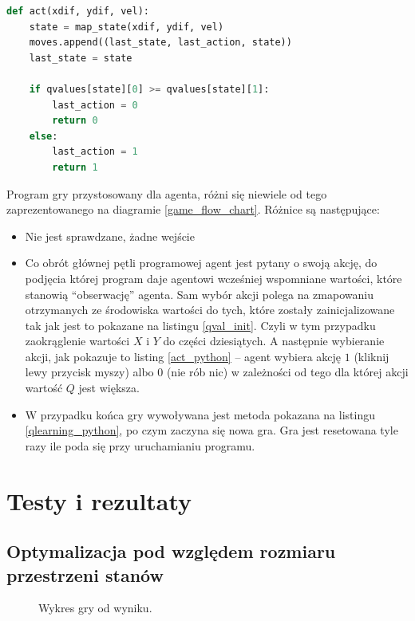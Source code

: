 \documentclass[a4paper, 12pt,oneside]{book}
\begin{document}
\begin{lstlisting}[language=Python, label={act_python},
caption={Metoda wybierająca akcję agenta}, captionpos=t]
def act(xdif, ydif, vel):
    state = map_state(xdif, ydif, vel)
    moves.append((last_state, last_action, state))
    last_state = state

    if qvalues[state][0] >= qvalues[state][1]:
        last_action = 0
        return 0
    else:
        last_action = 1
        return 1
\end{lstlisting}
Program gry przystosowany dla agenta, różni się niewiele od tego
zaprezentowanego na diagramie \ref{game_flow_chart}. Różnice są następujące:
\begin{itemize}
\setlength\itemsep{-0.4em}
\item Nie jest sprawdzane, żadne wejście
\item Co obrót głównej pętli programowej agent jest pytany o swoją akcję, do
	podjęcia której program daje agentowi wcześniej wspomniane wartości,
	które stanowią ``obserwację'' agenta. Sam wybór akcji polega na
	zmapowaniu otrzymanych ze środowiska wartości do tych, które zostały
	zainicjalizowane tak jak jest to pokazane na listingu \ref{qval_init}.
	Czyli w tym przypadku zaokrąglenie wartości $X$ i $Y$ do części
	dziesiątych. A następnie wybieranie akcji, jak pokazuje to
	listing \ref{act_python} -- agent wybiera akcję $1$ (kliknij lewy
	przycisk myszy) albo $0$ (nie rób nic) w zależności od tego dla której
	akcji wartość $Q$ jest większa.
\item W przypadku końca gry wywoływana jest metoda pokazana na listingu
	\ref{qlearning_python},  po czym zaczyna się nowa gra. Gra jest
	resetowana tyle razy ile poda się przy uruchamianiu programu.
\end{itemize}

\chapter{Testy i rezultaty}
\label{chapter:testy}
\section{Optymalizacja pod względem rozmiaru przestrzeni stanów}
\begin{figure}[!htb]
	\begin{center}
		
	\end{center}
	\caption{Wykres gry od wyniku.}
	\label{plot_first_approach}
\end{figure}
\end{document}
